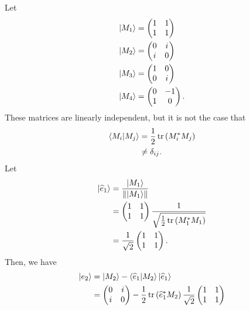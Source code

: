 \documentclass[10pt]{mypackage}
\begin{document}
\begin{example}
Let
\begin{align*}
  \ket{M_1} &= \begin{pmatrix}1 & 1 \\ 1 & 1\end{pmatrix}\\
  \ket{M_2} &= \begin{pmatrix}0 & i \\ i & 0\end{pmatrix}\\
  \ket{M_3} &= \begin{pmatrix}1 & 0 \\ 0 & i\end{pmatrix}\\
  \ket{M_4} &= \begin{pmatrix}0 & -1 \\ 1 & 0\end{pmatrix}.
\end{align*}
These matrices are linearly independent, but it is not the case that
\begin{align*}
  \braket{M_i}{M_j} &= \frac{1}{2}\tr\left(M_{i}^{\ast}M_j\right)\\
                    &\neq \delta_{ij}.
\end{align*}
Let
\begin{align*}
  \ket{\widehat{e}_1} &= \frac{\ket{M_1}}{\norm{\ket{M_1}}}\\
                  &= \begin{pmatrix} 1 & 1 \\ 1 & 1\end{pmatrix} \frac{1}{\sqrt{\frac{1}{2}\tr\left(M_{1}^{\ast}M_{1}\right)}}\\
                  &= \frac{1}{\sqrt{2}} \begin{pmatrix}1 & 1\\ 1 & 1\end{pmatrix}.
\end{align*}
Then, we have
\begin{align*}
  \ket{e_2} &= \ket{M_2} - \braket{\widehat{e}_1}{M_2}\ket{\widehat{e}_1}\\
            &= \begin{pmatrix}0 & i \\ i & 0\end{pmatrix} - \frac{1}{2}\tr\left(\widehat{e}_1^{\ast}M_2\right)\frac{1}{\sqrt{2}} \begin{pmatrix}1 & 1 \\ 1 & 1\end{pmatrix}\\

\end{align*}
\end{example}
\end{document}
